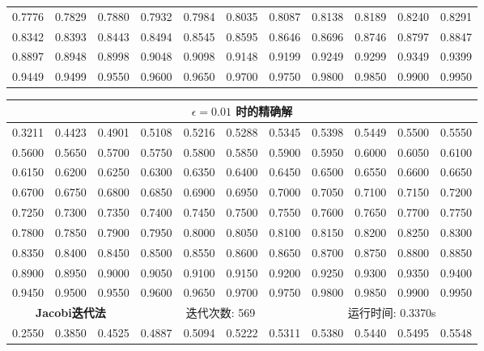 \documentclass{article}
\begin{document}
\begin{table}[H]
\begin{tabular}{|*{11}{c}|}
		0.7776 & 0.7829 & 0.7880 & 0.7932 & 0.7984 & 0.8035 & 0.8087 & 0.8138 & 0.8189 & 0.8240 & 0.8291 \\
		0.8342 & 0.8393 & 0.8443 & 0.8494 & 0.8545 & 0.8595 & 0.8646 & 0.8696 & 0.8746 & 0.8797 & 0.8847 \\
		0.8897 & 0.8948 & 0.8998 & 0.9048 & 0.9098 & 0.9148 & 0.9199 & 0.9249 & 0.9299 & 0.9349 & 0.9399 \\
		0.9449 & 0.9499 & 0.9550 & 0.9600 & 0.9650 & 0.9700 & 0.9750 & 0.9800 & 0.9850 & 0.9900 & 0.9950 \\
		\hline
	\end{tabular}
\end{table}

\begin{table}[H]
	\centering
	\begin{tabular}{|*{11}{c}|}
		\hline
		\multicolumn{11}{|c|}{\textbf{$\epsilon = 0.01$ 时的精确解}}\\
		\hline
		0.3211 & 0.4423 & 0.4901 & 0.5108 & 0.5216 & 0.5288 & 0.5345 & 0.5398 & 0.5449 & 0.5500 & 0.5550 \\
		0.5600 & 0.5650 & 0.5700 & 0.5750 & 0.5800 & 0.5850 & 0.5900 & 0.5950 & 0.6000 & 0.6050 & 0.6100 \\
		0.6150 & 0.6200 & 0.6250 & 0.6300 & 0.6350 & 0.6400 & 0.6450 & 0.6500 & 0.6550 & 0.6600 & 0.6650 \\
		0.6700 & 0.6750 & 0.6800 & 0.6850 & 0.6900 & 0.6950 & 0.7000 & 0.7050 & 0.7100 & 0.7150 & 0.7200 \\
		0.7250 & 0.7300 & 0.7350 & 0.7400 & 0.7450 & 0.7500 & 0.7550 & 0.7600 & 0.7650 & 0.7700 & 0.7750 \\
		0.7800 & 0.7850 & 0.7900 & 0.7950 & 0.8000 & 0.8050 & 0.8100 & 0.8150 & 0.8200 & 0.8250 & 0.8300 \\
		0.8350 & 0.8400 & 0.8450 & 0.8500 & 0.8550 & 0.8600 & 0.8650 & 0.8700 & 0.8750 & 0.8800 & 0.8850 \\
		0.8900 & 0.8950 & 0.9000 & 0.9050 & 0.9100 & 0.9150 & 0.9200 & 0.9250 & 0.9300 & 0.9350 & 0.9400 \\
		0.9450 & 0.9500 & 0.9550 & 0.9600 & 0.9650 & 0.9700 & 0.9750 & 0.9800 & 0.9850 & 0.9900 & 0.9950 \\
		\hline
		\multicolumn{3}{|c}{\textbf{Jacobi迭代法}} & \multicolumn{4}{|c}{迭代次数: 569}\ & \multicolumn{4}{|c|}{运行时间: 0.3370s}\\
		\hline
		0.2550 & 0.3850 & 0.4525 & 0.4887 & 0.5094 & 0.5222 & 0.5311 & 0.5380 & 0.5440 & 0.5495 & 0.5548 \\

\end{tabular}
\end{table}
\end{document}
